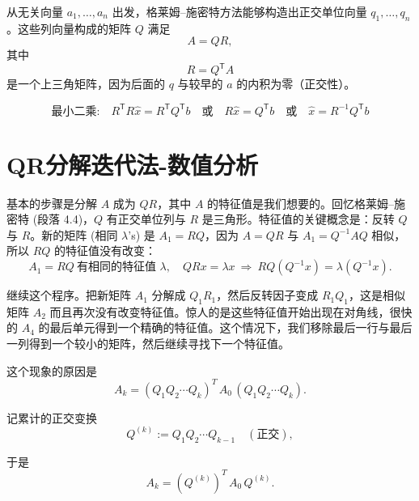 \begin{theorem}
从无关向量 $a_1, \dots, a_n$ 出发，格莱姆–施密特方法能够构造出正交单位向量 
$q_1, \dots, q_n$。这些列向量构成的矩阵 $Q$ 满足
\[
A = QR,
\]
其中
\[
R = Q^{\mathsf T} A
\]
是一个上三角矩阵，因为后面的 $q$ 与较早的 $a$ 的内积为零（正交性）。
\end{theorem}
\begin{equation}
\text{最小二乘:} \quad 
R^{\mathsf T} R \hat{x} = R^{\mathsf T} Q^{\mathsf T} b
\quad \text{或} \quad
R \hat{x} = Q^{\mathsf T} b
\quad \text{或} \quad
\hat{x} = R^{-1} Q^{\mathsf T} b
\tag{10}
\end{equation}
\section{QR分解迭代法-数值分析}
基本的步骤是分解 $A$ 成为 $QR$，其中 $A$ 的特征值是我们想要的。回忆格莱姆–施密特 (段落 4.4)，$Q$ 有正交单位列与 $R$ 是三角形。特征值的关键概念是：反转 $Q$ 与 $R$。新的矩阵 (相同 $\lambda$’s) 是 $A_1 = RQ$，因为 $A = QR$ 与 $A_1 = Q^{-1}AQ$ 相似，所以 $RQ$ 的特征值没有改变：
\[
A_1 = RQ \ \text{有相同的特征值 } \lambda, 
\quad QRx = \lambda x 
\ \Rightarrow\ 
RQ(Q^{-1}x) = \lambda (Q^{-1}x).
\tag{12}
\]

继续这个程序。把新矩阵 $A_1$ 分解成 $Q_1R_1$，然后反转因子变成 $R_1Q_1$，这是相似矩阵 $A_2$ 而且再次没有改变特征值。惊人的是这些特征值开始出现在对角线，很快的 $A_4$ 的最后单元得到一个精确的特征值。这个情况下，我们移除最后一行与最后一列得到一个较小的矩阵，然后继续寻找下一个特征值。


这个现象的原因是
\[
A_k = (Q_1 Q_2 \cdots Q_k)^{\!T}\, A_0\, (Q_1 Q_2 \cdots Q_k).
\]

记累计的正交变换
\[
Q^{(k)} := Q_1 Q_2 \cdots Q_{k-1} \quad (\text{正交}),
\]

于是
\[
A_k = (Q^{(k)})^{\!T}\, A_0\, Q^{(k)}.
\]

